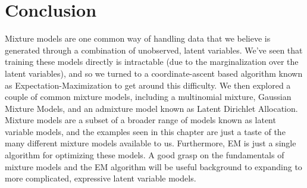 \section{Conclusion}
Mixture models are one common way of handling data that we believe is generated through a combination of unobserved, latent variables. We've seen that training these models directly is intractable (due to the marginalization over the latent variables), and so we turned to a coordinate-ascent based algorithm known as Expectation-Maximization to get around this difficulty. We then explored a couple of common mixture models, including a multinomial mixture, Gaussian Mixture Models, and an admixture model known as Latent Dirichlet Allocation. Mixture models are a subset of a broader range of models known as latent variable models, and the examples seen in this chapter are just a taste of the many different mixture models available to us. Furthermore, EM is just a single algorithm for optimizing these models. A good grasp on the fundamentals of mixture models and the EM algorithm will be useful background to expanding to more complicated, expressive latent variable models.
